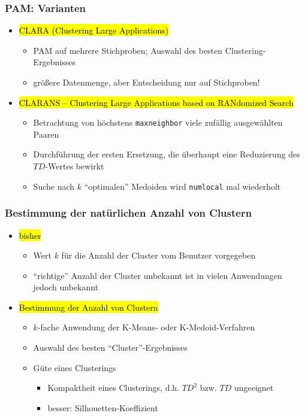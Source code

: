 \begin{frame}
\frametitle{PAM: Varianten}

\begin{itemize}
\item\hl{CLARA (Clustering Large Applications)}
\begin{itemize}
\item PAM auf mehrere Stichproben; Auswahl des besten Clustering-Ergebnisses 
\item größere Datenmenge, aber Entscheidung nur auf Stichproben! 
\end{itemize}
\item\hl{CLARANS -- Clustering Large Applications based on RANdomized Search}
\begin{itemize}
\item Betrachtung von höchstens \texttt{maxneighbor} viele zufällig ausgewählten
  Paaren  
\item Durchführung der ersten Ersetzung, die überhaupt eine
  Reduzierung des $TD$-Wertes bewirkt 
\item Suche nach $k$ "`optimalen"' Medoiden wird \texttt{numlocal} mal wiederholt 
\end{itemize}
\end{itemize}

\end{frame}



\begin{frame}
\frametitle{Bestimmung der natürlichen Anzahl von Clustern}

\begin{itemize}
\item \hl{bisher} 
\begin{itemize}
\item Wert $k$ für die Anzahl der Cluster vom Benutzer vorgegeben 
\item "`richtige"' Anzahl der Cluster unbekannt ist in vielen
  Anwendungen jedoch unbekannt  
\end{itemize}
\item \hl{Bestimmung der Anzahl von Clustern}
\begin{itemize}
\item $k$-fache Anwendung der K-Means- oder K-Medoid-Verfahren 
\item Auswahl des besten "`Cluster"'-Ergebnisses 
\item Güte eines Clusterings 
\begin{itemize}
\item Kompaktheit eines Clusterings, d.h. $TD^2$ bzw. $TD$ ungeeignet 
\item besser: Silhouetten-Koeffizient 
\end{itemize}
\end{itemize}
\end{itemize}

\end{frame}

